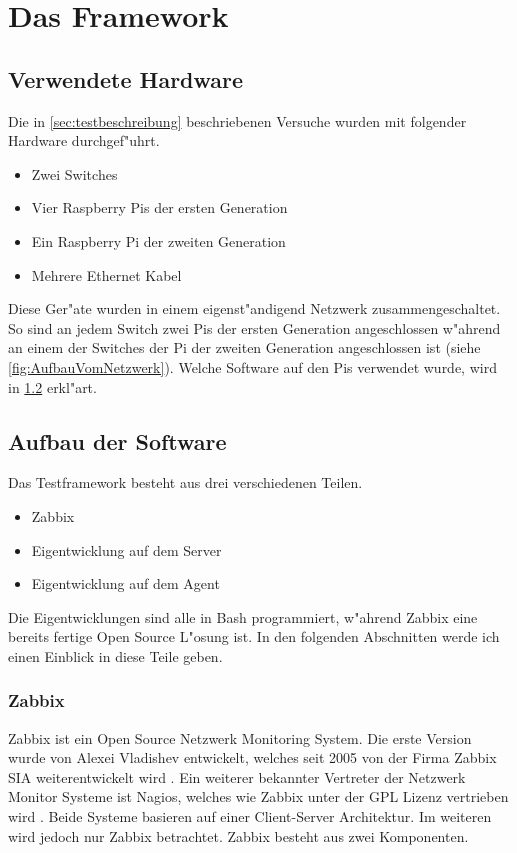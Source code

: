 \chapter{Das Framework}
\label{cha:framework}
\section{Verwendete Hardware} \label{sec:verwendeteHardware}
Die in \cref{sec:testbeschreibung} beschriebenen Versuche wurden mit folgender Hardware durchgef"uhrt. %
\begin{itemize}
\item Zwei Switches
\item Vier Raspberry Pis der ersten Generation
\item Ein Raspberry Pi der zweiten Generation
\item Mehrere Ethernet Kabel
\end{itemize}
Diese Ger"ate wurden in einem eigenst"andigend Netzwerk zusammengeschaltet. So sind an jedem Switch zwei Pis %
der ersten Generation angeschlossen w"ahrend an einem der Switches der Pi der zweiten Generation angeschlossen %
ist (siehe \cref{fig:AufbauVomNetzwerk}). Welche Software auf den Pis verwendet wurde, wird in \cref{sec:aufbauSoftware} erkl"art. 

\section{Aufbau der Software} \label{sec:aufbauSoftware}
Das Testframework besteht aus drei verschiedenen Teilen. %
\begin{itemize}
\item Zabbix %
\item Eigentwicklung auf dem Server %
\item Eigentwicklung auf dem Agent %
\end{itemize}
Die Eigentwicklungen sind alle in Bash programmiert, w"ahrend Zabbix eine bereits fertige Open Source L"osung %
ist. In den folgenden Abschnitten werde ich einen Einblick in diese Teile geben. %

\subsection{Zabbix}
Zabbix ist ein Open Source Netzwerk Monitoring System. Die erste Version wurde von Alexei Vladishev entwickelt, welches %
seit 2005 von der Firma Zabbix SIA weiterentwickelt wird \autocite{zabbix:Web}. %
Ein weiterer bekannter Vertreter der Netzwerk Monitor Systeme ist Nagios, welches wie Zabbix unter der GPL Lizenz vertrieben wird \autocite{wiki:Nagios}. %
Beide Systeme basieren auf einer Client-Server Architektur. Im weiteren wird jedoch nur Zabbix betrachtet. %
Zabbix besteht aus zwei Komponenten. %

